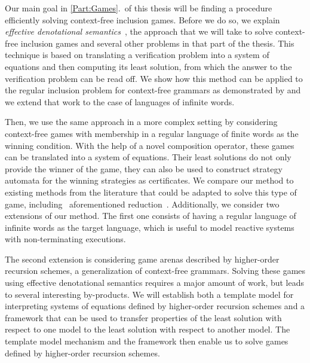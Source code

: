 \documentclass[../../diss.tex]{subfiles}
\begin{document}
Our main goal in \cref{Part:Games}.~of this thesis will be finding a procedure efficiently solving context-free inclusion games.
Before we do so, we explain \emph{effective denotational semantics}~\cite{Aehlig07,Summers77,SalvatiW15}, the approach that we will take to solve context-free inclusion games and several other problems in that part of the thesis.
This technique is based on translating a verification problem into a system of equations and then computing its least solution, from which the answer to the verification problem can be read off.
We show how this method can be applied to the regular inclusion problem for context-free grammars as demonstrated by  and we extend that work to the case of languages of infinite words.

Then, we use the same approach in a more complex setting by considering context-free games with membership in a regular language of finite words as the winning condition.
With the help of a novel composition operator, these games can be translated into a system of equations.
Their least solutions do not only provide the winner of the game, they can also be used to construct strategy automata for the winning strategies as certificates.
We compare our method to existing methods from the literature that could be adapted to solve this type of game, including \Walus~aforementioned reduction~\cite{Walukiewicz01}.
Additionally, we consider two extensions of our method.
The first one consists of having a regular language of infinite words as the target language, which is useful to model reactive systems with non-terminating executions.

The second extension is considering game arenas described by higher-order recursion schemes, a generalization of context-free grammars.
Solving these games using effective denotational semantics requires a major amount of work, but leads to several interesting by-products.
We will establish both a template model for interpreting systems of equations defined by higher-order recursion schemes and a framework that can be used to transfer properties of the least solution with respect to one model to the least solution with respect to another model.
The template model mechanism and the framework then enable us to solve games defined by higher-order recursion schemes.

\end{document}
